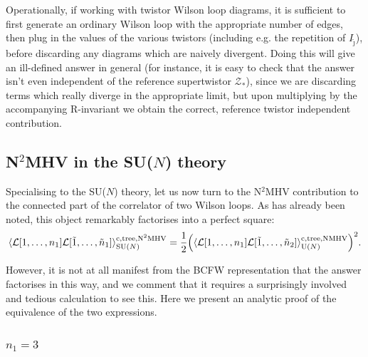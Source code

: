 \documentclass[12pt]{article}
\numberwithin{equation}{section}
\begin{document}
Operationally, if working with twistor Wilson loop diagrams, it is sufficient to first generate an ordinary Wilson loop with the appropriate number of edges, then plug in the values of the various twistors (including e.g. the repetition of \(I_{\tilde{\jmath}}\)), before discarding any diagrams which are naively divergent. Doing this will give an ill-defined answer in general (for instance, it is easy to check that the answer isn't even independent of the reference supertwistor \(\mathcal{Z}_*\)), since we are discarding terms which really diverge in the appropriate limit, but upon multiplying by the accompanying R-invariant we obtain the correct, reference twistor independent contribution. 

\subsection{N\texorpdfstring{\(^2\)}{2}MHV in the SU(\texorpdfstring{$N$}{N}) theory}

Specialising to the SU($N$) theory, let us now turn to the N\(^2\)MHV contribution to the connected part of the correlator of two Wilson loops. As has already been noted, this object remarkably factorises into a perfect square: 
\begin{equation}
\langle\mathcal{L}[1,\ldots,n_1]\mathcal{L}[\tilde{1},\ldots,\tilde{n}_1] \rangle^{\rm{c,tree, N}^2\rm{MHV}}_{{\rm SU}(N)}= \frac{1}{2}\Bigl(\langle\mathcal{L}[1,\ldots,n_1]\mathcal{L}[\tilde{1},\ldots,\tilde{n}_2] \rangle^{\rm{c, tree, NMHV}}_{{\rm U}(N)} \Bigr)^2.
\end{equation}

However, it is not at all manifest from the BCFW representation that the answer factorises in this way, and we comment that it requires a surprisingly involved and tedious calculation to see this. Here we present an analytic proof of the equivalence of the two expressions.

\subsubsection{\texorpdfstring{\(n_1=3\)}{n1=3}}
\end{document}
